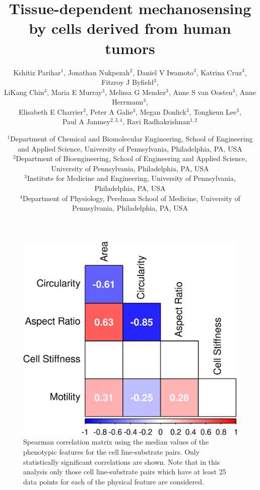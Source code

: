 \documentclass[11pt,letterpaper,english,oneside]{article} %
\author{Kshitiz Parihar$^1$, 
Jonathan Nukpezah$^2$, 
Daniel V Iwamoto$^3$, 
Katrina Cruz$^3$, 
Fitzroy J Byfield$^3$, \\
LiKang Chin$^3$, 
Maria E Murray$^3$, 
Melissa G Mendez$^3$, 
Anne S van Oosten$^3$, 
Anne Herrmann$^3$, \\
Elisabeth E Charrier$^3$, 
Peter A Galie$^3$, 
Megan Donlick$^3$, 
Tongkeun Lee$^3$, \\
Paul A Janmey$^{2,3,4}$, 
Ravi Radhakrishnan$^{1,2}$
}
\title{Tissue-dependent mechanosensing by cells derived from human tumors}
\date{%
    $^1$Department of Chemical and Biomolecular Engineering, School of Engineering and Applied Science, University of Pennsylvania, Philadelphia, PA, USA \\
    $^2$Department of Bioengineering, School of Engineering and Applied Science, University of Pennsylvania, Philadelphia, PA, USA \\
    $^3$Institute for Medicine and Engineering, University of Pennsylvania, Philadelphia, PA, USA \\
    $^4$Department of Physiology, Perelman School of Medicine, University of Pennsylvania, Philadelphia, PA, USA \\
}
\begin{document}
\renewcommand{\figurename}{Supplementary Figure}

\maketitle








\begin{figure}
    \centering
    \includegraphics[scale=0.8]{../Figures/supplementary_figure1.png}
    \caption{Spearman correlation matrix using the median values of the phenotypic features for the cell line-substrate pairs. Only statistically significant correlations are shown.
    Note that in this analysis only those cell line-substrate pairs which have at least 25 data points for each of the physical feature are considered.}
    \label{fig:fig1}
\end{figure}
\clearpage
\end{document}

